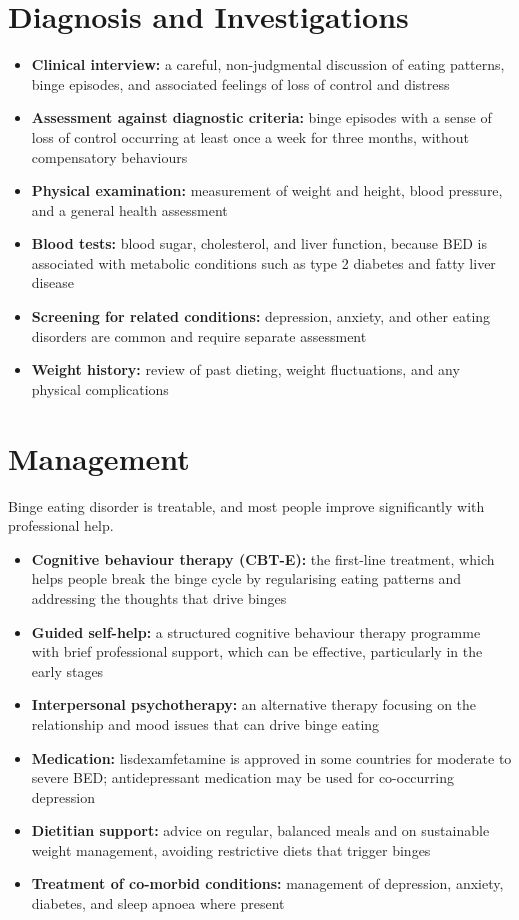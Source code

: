 \section*{Diagnosis and Investigations}
\begin{itemize}
    \item \textbf{Clinical interview:} a careful, non-judgmental discussion of eating patterns, binge episodes, and associated feelings of loss of control and distress
    \item \textbf{Assessment against diagnostic criteria:} binge episodes with a sense of loss of control occurring at least once a week for three months, without compensatory behaviours
    \item \textbf{Physical examination:} measurement of weight and height, blood pressure, and a general health assessment
    \item \textbf{Blood tests:} blood sugar, cholesterol, and liver function, because BED is associated with metabolic conditions such as type 2 diabetes and fatty liver disease
    \item \textbf{Screening for related conditions:} depression, anxiety, and other eating disorders are common and require separate assessment
    \item \textbf{Weight history:} review of past dieting, weight fluctuations, and any physical complications
\end{itemize}

\section*{Management}
Binge eating disorder is treatable, and most people improve significantly with professional help.

\begin{itemize}
    \item \textbf{Cognitive behaviour therapy (CBT-E):} the first-line treatment, which helps people break the binge cycle by regularising eating patterns and addressing the thoughts that drive binges
    \item \textbf{Guided self-help:} a structured cognitive behaviour therapy programme with brief professional support, which can be effective, particularly in the early stages
    \item \textbf{Interpersonal psychotherapy:} an alternative therapy focusing on the relationship and mood issues that can drive binge eating
    \item \textbf{Medication:} lisdexamfetamine is approved in some countries for moderate to severe BED; antidepressant medication may be used for co-occurring depression
    \item \textbf{Dietitian support:} advice on regular, balanced meals and on sustainable weight management, avoiding restrictive diets that trigger binges
    \item \textbf{Treatment of co-morbid conditions:} management of depression, anxiety, diabetes, and sleep apnoea where present
\end{itemize}

